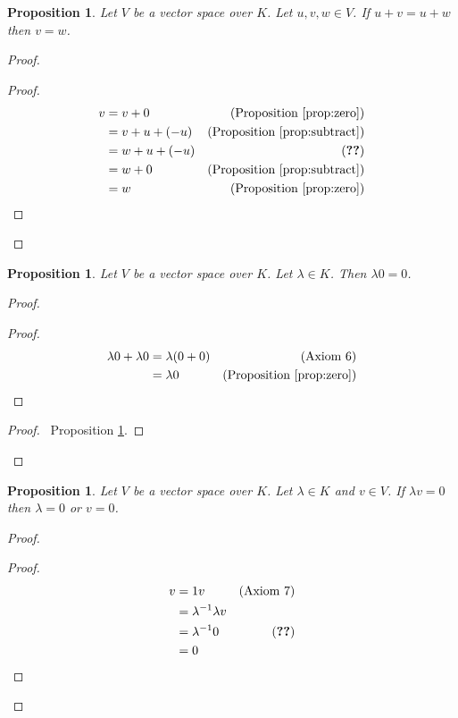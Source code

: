 \documentclass{book}
\let\qed\relax
\newtheorem{prop}[ax]{Proposition}
\theoremstyle{definition}
\begin{document}
\begin{prop}
\label{prop:cancel}
Let $V$ be a vector space over $K$. Let $u,v,w \in V$. If $u + v = u + w$ then $v = w$.
\end{prop}

\begin{proof}
\pf
{}
\begin{proof}
	\pf
	\begin{align*}
		v & = v + 0 & (\text{Proposition \ref{prop:zero}}) \\
		& = v + u + (-u) & (\text{Proposition \ref{prop:subtract}}) \\
		& = w + u + (-u) & (\text{\stepref{1}}) \\
		& = w + 0 & (\text{Proposition \ref{prop:subtract}}) \\
		& = w & (\text{Proposition \ref{prop:zero}})
	\end{align*}
\end{proof}
\end{proof}

\begin{prop}
Let $V$ be a vector space over $K$. Let $\lambda \in K$. Then $\lambda 0 = 0$.
\end{prop}

\begin{proof}
\pf
{}
\begin{proof}
	\pf
	\begin{align*}
		\lambda 0 + \lambda 0 & = \lambda (0 + 0) & (\text{Axiom 6}) \\
		& = \lambda 0 & (\text{Proposition \ref{prop:zero}})
	\end{align*}
\end{proof}
\begin{proof}
	\pf\ Proposition \ref{prop:cancel}.
\end{proof}
\qed
\end{proof}

\begin{prop}
Let $V$ be a vector space over $K$. Let $\lambda \in K$ and $v \in V$. If $\lambda v = 0$ then $\lambda = 0$ or $v = 0$.
\end{prop}

\begin{proof}
\pf
{}
\begin{proof}
	\pf
	\begin{align*}
		v & = 1 v & (\text{Axiom 7}) \\
		& = \lambda^{-1} \lambda v \\
		& = \lambda^{-1} 0 & (\text{\stepref{2}}) \\
		& = 0
	\end{align*}
\end{proof}
\qed
\end{proof}
\end{document}
